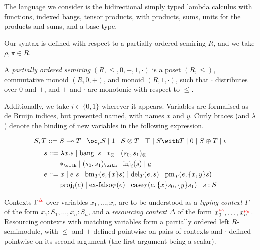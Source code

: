 The language we consider is the bidirectional\cite{DBLP:journals/toplas/PierceT00} simply typed lambda
calculus\cite{Barendregt92lambdacalculi} with functions, indexed bangs, tensor products, with products,
sums, units for the products and sums, and a base type.

Our syntax is defined with respect to a partially ordered semiring $R$, and we take $\rho,\pi \in R$.

\begin{definition}
  A \emph{partially ordered semiring} $(R, \leq, 0, +, 1 , \cdot)$ is a poset $(R, \leq)$, commutative monoid $(R, 0, +)$, and monoid $(R, 1, \cdot)$, such that $\cdot$ distributes over $0$ and $+$, and $+$ and $\cdot$ are monotonic with respect to $\leq$.
\end{definition}

Additionally, we take $i \in \{0,1\}$ wherever it appears.
Variables are formalised as de Bruijn indices\cite{deBruijn:dummies}, but
presented named, with names $x$ and $y$.
Curly braces (and $\lambda$) denote the binding of new variables in the following expression.

\begin{displaymath}
  S,T ::= \fun{S}{T} \mid \excl{\rho}{S} \mid \tensorOne \mid \tensor{S}{T} \mid
  \withTOne \mid \withT{S}{T} \mid \sumTZero \mid \sumT{S}{T} \mid \iota
\end{displaymath}
\begin{displaymath}
  \begin{aligned}
    s &  ::= \lam{x}{s} \mid \bang{s} \mid \unit \mid \ten{s_0}{s_1} \\
      & \quad \mid \eat \mid \wth{s_0}{s_1} \mid \inj{i}{s} \mid \emb{e} \\
    e &  ::= x \mid \app{e}{s} \mid \bm{T}{e}{\bind{x}{s}} \mid \del{T}{e}{s} \mid \prm{T}{e}{\bind{x,y}{s}} \\
      & \quad \mid \proj{i}{e} \mid \exf{T}{e} \mid
             \cse{T}{e}{\bind{x}{s_0}}{\bind{y}{s_1}} \mid \ann{s}{S}
  \end{aligned}
\end{displaymath}

Contexts $\Gamma^{\color{red}\Delta}$ over variables $x_1, \ldots, x_n$ are to be understood as a \emph{typing context} $\Gamma$ of the form $x_1 : S_1, \ldots, x_n : S_n$, and a \emph{resourcing context} $\Delta$ of the form $x_0^{{\color{red}\rho_0}}, \ldots, x_n^{{\color{red}\rho_n}}$.
Resourcing contexts with matching variables form a partially ordered left
$R$-semimodule, with $\leq$ and $+$ defined pointwise on pairs of contexts and
$\cdot$ defined pointwise on its second argument (the first argument being a scalar).


